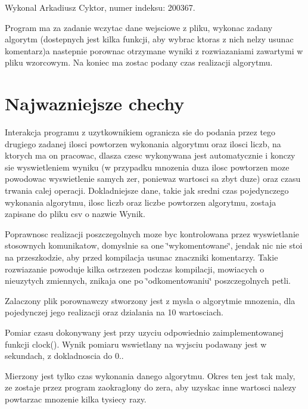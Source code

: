 \-Wykonal \-Arkadiusz \-Cyktor, numer indeksu\-: 200367.

\-Program ma za zadanie wczytac dane wejsciowe z pliku, wykonac zadany algorytm (dostepnych jest kilka funkcji, aby wybrac ktoras z nich nelzy usunac komentarz)a nastepnie porownac otrzymane wyniki z rozwiazaniami zawartymi w pliku wzorcowym. \-Na koniec ma zostac podany czas realizacji algorytmu.\hypertarget{index_etykieta-Wazne-cechy}{}\section{\-Najwazniejsze chechy}\label{index_etykieta-Wazne-cechy}
\-Interakcja programu z uzytkownikiem ogranicza sie do podania przez tego drugiego zadanej ilosci powtorzen wykonania algorytmu oraz ilosci liczb, na ktorych ma on pracowac, dlasza czesc wykonywana jest automatycznie i konczy sie wyswietleniem wyniku (w przypadku mnozenia duza ilosc powtorzen moze powodowac wyswietlenie samych zer, poniewaz wartosci sa zbyt duze) oraz czasu trwania calej operacji. \-Dokladniejsze dane, takie jak sredni czas pojedynczego wykonania algorytmu, ilosc liczb oraz liczbe powtorzen algorytmu, zostaja zapisane do pliku csv o nazwie \-Wynik.

\-Poprawnosc realizacji poszczegolnych moze byc kontrolowana przez wyswietlanie stosownych komunikatow, domyslnie sa one \char`\"{}wykomentowane\char`\"{}, jendak nic nie stoi na przeszkodzie, aby przed kompilacja usunac znaczniki komentarzy. \-Takie rozwiazanie powoduje kilka ostrzezen podczas kompilacji, mowiacych o nieuzytych zmiennych, znikaja one po \char`\"{}odkomentowaniu\char`\"{} poszczegolnych petli.

\-Zalaczony plik porownawczy stworzony jest z mysla o algorytmie mnozenia, dla pojedynczej jego realizacji oraz dzialania na 10 wartosciach.

\-Pomiar czasu dokonywany jest przy uzyciu odpowiednio zaimplementowanej funkcji clock(). \-Wynik pomiaru wswietlany na wyjsciu podawany jest w sekundach, z dokladnoscia do 0..

\-Mierzony jest tylko czas wykonania danego algorytmu. \-Okres ten jest tak maly, ze zostaje przez program zaokraglony do zera, aby uzyskac inne wartosci nalezy powtarzac mnozenie kilka tysiecy razy. 